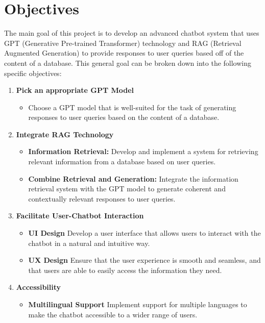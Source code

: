 \documentclass[a4paper,12pt,twoside]{ThesisStyle}
\begin{document}
\chapter{Objectives}
\label{cap:objectives}

The main goal of this project is to develop an advanced chatbot system that uses GPT (Generative Pre-trained Transformer) technology and RAG (Retrieval Augmented Generation) to provide responses to user queries based off of the content of a database. This general goal can be broken down into the following specific objectives:

\begin{enumerate}
  \item \textbf{Pick an appropriate GPT Model}
        \begin{itemize}
          \item Choose a GPT model that is well-suited for the task of generating responses to user queries based on the content of a database.
        \end{itemize}
  \item \textbf{Integrate RAG Technology}
        \begin{itemize}
          \item \textbf{Information Retrieval:} Develop and implement a system for retrieving relevant information from a database based on user queries.
          \item \textbf{Combine Retrieval and Generation:} Integrate the information retrieval system with the GPT model to generate coherent and contextually relevant responses to user queries.
        \end{itemize}
  \item \textbf{Facilitate User-Chatbot Interaction}
        \begin{itemize}
          \item \textbf{UI Design} Develop a user interface that allows users to interact with the chatbot in a natural and intuitive way.
          \item \textbf{UX Design} Ensure that the user experience is smooth and seamless, and that users are able to easily access the information they need.
        \end{itemize}
  \item \textbf{Accessibility}
        \begin{itemize}
          \item \textbf{Multilingual Support} Implement support for multiple languages to make the chatbot accessible to a wider range of users.

\end{itemize}
\end{enumerate}
\end{document}
